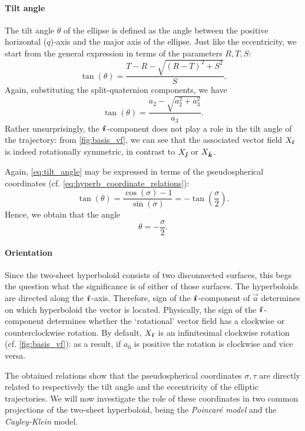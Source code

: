 \paragraph{Tilt angle} The tilt angle $\theta$ of the ellipse is defined as the angle between the positive horizontal ($q$)-axis and the major axis of the ellipse. Just like the eccentricity, we start from the general expression in terms of the parameters $R, T, S$:
\begin{equation}
    \tan(\theta) = \frac{T - R - \sqrt{(R - T)^2 + S^2}}{S}.
\end{equation}
Again, substituting the split-quaternion components, we have
\begin{equation}
    \tan(\theta) = \frac{a_2 - \sqrt{a_2^2 + a_3^2}}{a_3}.
    \label{eq:tilt_angle}
\end{equation}
Rather unsurprisingly, the $\quati$-component does not play a role in the tilt angle of the trajectory: from \cref{fig:basis_vf}, we can see that the associated vector field $X_\quati$ is indeed rotationally symmetric, in contrast to $X_\quatj$ or $X_\quatk$.

Again, \cref{eq:tilt_angle} may be expressed in terms of the pseudospherical coordinates (cf. \cref{eq:hyperb_coordinate_relations}):
$$ \tan(\theta) = \frac{\cos(\sigma) - 1}{\sin(\sigma)} = -\tan(\frac{\sigma}{2}).$$
Hence, we obtain that the angle 
$$\theta = -\frac{\sigma}{2}.$$

\paragraph{Orientation} Since the two-sheet hyperboloid consists of two disconnected surfaces, this begs the question what the significance is of either of those surfaces. The hyperboloids are directed along the $\quati$-axis. Therefore, sign of the $\quati$-component of $\vec{a}$ determines on which hyperboloid the vector is located. Physically, the sign of the $\quati$-component determines whether the `rotational' vector field has a clockwise or counterclockwise rotation. By default, $X_\quati$ is an infinitesimal clockwise rotation (cf. \cref{fig:basis_vf}): as a result, if $a_0$ is positive the rotation is clockwise and vice versa.

The obtained relations show that the pseudospherical coordinates $\sigma, \tau$ are directly related to respectively the tilt angle and the eccentricity of the elliptic trajectories. We will now investigate the role of these coordinates in two common projections of the two-sheet hyperboloid, being the \emph{Poincaré model} and the \emph{Cayley-Klein} model.

